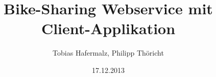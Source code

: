 \author{Tobias Hafermalz, Philipp Thöricht}
\title{Bike-Sharing Webservice mit Client-Applikation}
\date{17.12.2013}
\maketitle
